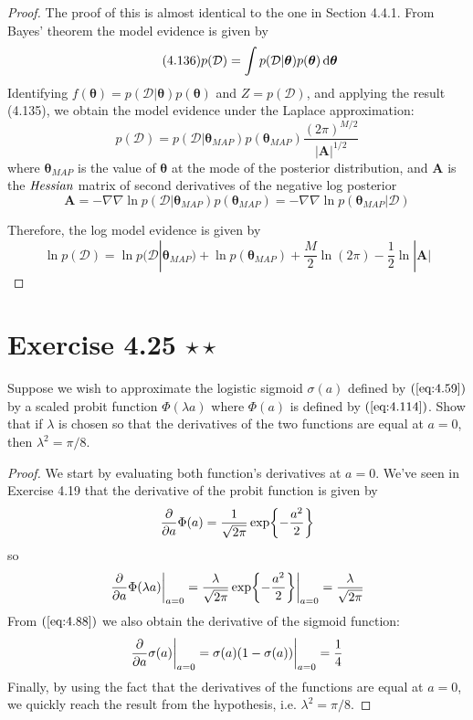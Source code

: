\begin{proof}
    The proof of this is almost identical to the one in Section 4.4.1.
    From Bayes' theorem the model evidence is given by
    \begin{equation}\label{eq:4.136}\tag{4.136}
        p(\mathcal{D}) 
        = \int p(\mathcal{D} | \bm{\theta}) p(\bm{\theta}) \mathop{}\!\mathrm{d} \bm{\theta}
    \end{equation}
    Identifying $f(\bm{\theta}) = p(\mathcal{D} | \bm{\theta})p(\bm{\theta})$
    and $Z = p(\mathcal{D})$, and applying the result (4.135),
    we obtain the model evidence under the Laplace approximation:
    \[
        p(\mathcal{D}) 
        = p(\mathcal{D} | \bm{\theta}_{MAP})p(\bm{\theta}_{MAP}) 
        \frac{(2\pi)^{M/2}}{|\mathbf{A}|^{1/2}}
    \] 
    where $\bm{\theta}_{MAP}$ is the value of $\bm{\theta}$ at the mode
    of the posterior distribution, and $\mathbf{A}$ is the $\emph{Hessian}$ 
    matrix of second derivatives of the negative log posterior
    \begin{equation}\label{eq:4.138}\tag{4.138}
        \mathbf{A} 
        = -\nabla \nabla \ln p(\mathcal{D} | \bm{\theta}_{MAP})p(\bm{\theta}_{MAP})
        = -\nabla \nabla \ln p(\bm{\theta}_{MAP} | \mathcal{D})
    \end{equation}

    Therefore, the log model evidence is given by 
    \begin{equation}\label{eq:4.137}\tag{4.137}
        \ln p(\mathcal{D}) 
        = \ln p(\mathcal{D} | \bm{\theta}_{MAP}) + \ln p(\bm{\theta}_{MAP})
        + \frac{M}{2} \ln (2\pi) - \frac{1}{2} \ln |\mathbf{A}|
    \end{equation}
\end{proof}

\section*{Exercise 4.25 $\star \star$}
Suppose we wish to approximate the logistic sigmoid $\sigma(a)$ 
defined by $(\ref{eq:4.59})$ by a scaled probit function
$\Phi(\lambda a)$ where $\Phi(a)$ is defined by $(\ref{eq:4.114})$.
Show that if $\lambda$ is chosen so that the derivatives of the two
functions are equal at $a = 0$, then  $\lambda^2 = \pi/8$.

\vspace{1em}

\begin{proof}
    We start by evaluating both function's derivatives at $a=0$.
    We've seen in Exercise 4.19 that the derivative of the probit function
    is given by
     \[
         \pdv{a} \Phi(a) = \frac{1}{\sqrt{2\pi}} \exp{-\frac{a^2}{2}}
    \] 
    so
    \[
        \pdv{a} \Phi(\lambda a)\bigg|_{a=0}
        = \frac{\lambda}{\sqrt{2\pi}} \exp{-\frac{a^2}{2}}\bigg|_{a=0}
        = \frac{\lambda}{\sqrt{2\pi}}
    \] 
    From $(\ref{eq:4.88})$ we also obtain the derivative of the sigmoid function:
     \[
         \pdv{a} \sigma(a)\bigg|_{a=0} = \sigma(a)(1 - \sigma(a))\bigg|_{a = 0}
         = \frac{1}{4}
    \] 
    Finally, by using the fact that the derivatives of the functions are
    equal at $a=0$, we quickly reach the result from the hypothesis, 
    i.e. $\lambda^2 = \pi / 8$.
\end{proof}
